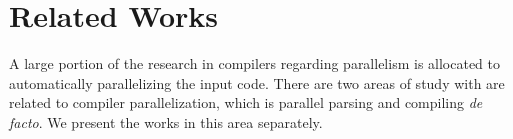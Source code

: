 
\newcommand{\sla}{\textbackslash}

\newcommand{\cmd}[1]{\textsf{#1}}

\newcommand{\pkg}[1]{\textsf{#1}}

\newcommand{\ltxcmd}[1]{\cmd{\sla{}#1}}

\chapter{Related Works}
\label{chap:related_works}

A large portion of the research in compilers regarding parallelism is allocated
to automatically parallelizing the input code. There are two areas of study
with are related to compiler parallelization, which is parallel parsing and
compiling \textit{de facto}. We present the works in this area separately.


